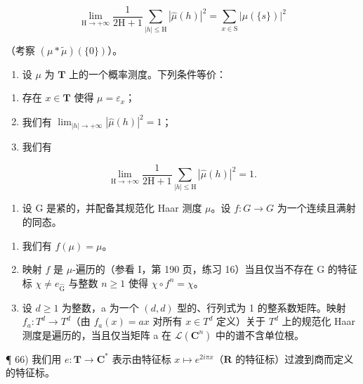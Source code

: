 \[
\lim _ {\mathrm{H} \to + \infty} \frac {1}{2 \mathrm{H} + 1} \sum_ {| h | \leqslant \mathrm{H}} | \widehat {\mu} (h) | ^ {2} = \sum_ {x \in \mathrm{S}} | \mu (\{s \}) | ^ {2}
\]

（考察 \((\mu * \widetilde{\mu})(\{0\})\)）。

\begin{enumerate}
\def\labelenumi{\alph{enumi})}
\setcounter{enumi}{2}
\tightlist
\item
  设 \(\mu\) 为 \(\mathbf{T}\) 上的一个概率测度。下列条件等价：
\end{enumerate}

\begin{enumerate}
\def\labelenumi{(\roman{enumi})}
\item
  存在 \(x \in \mathbf{T}\) 使得 \(\mu = \varepsilon_x\)；
\item
  我们有 \(\lim_{|h|\to+\infty}|\widehat{\mu}(h)|^{2}=1\)；
\item
  我们有
\end{enumerate}

\[
\lim _ {\mathrm{H} \rightarrow + \infty} \frac {1}{2 \mathrm{H} + 1} \sum_ {| h | \leqslant \mathrm{H}} | \widehat {\mu} (h) | ^ {2} = 1.
\]

\begin{enumerate}
\def\labelenumi{\arabic{enumi})}
\setcounter{enumi}{64}
\tightlist
\item
  设 G 是紧的，并配备其规范化 Haar 测度 \(\mu\)。设 \(f: G \to G\) 为一个连续且满射的同态。
\end{enumerate}

\begin{enumerate}
\def\labelenumi{\alph{enumi})}
\item
  我们有 \(f(\mu) = \mu\)。
\item
  映射 \(f\) 是 \(\mu\)-遍历的（参看 I，第 190 页，练习 16）当且仅当不存在 G 的特征标 \(\chi \neq e_{\widehat{\mathrm{G}}}\) 与整数 \(n \geqslant 1\) 使得 \(\chi \circ f^n = \chi\)。
\item
  设 \(d \geqslant 1\) 为整数，a 为一个 \((d, d)\) 型的、行列式为 1 的整系数矩阵。映射 \(f_{a} \colon T^{d} \to T^{d}\)（由 \(f_{a}(x) = ax\) 对所有 \(x \in T^{d}\) 定义）关于 \(T^{d}\) 上的规范化 Haar 测度是遍历的，当且仅当矩阵 a 在 \(\mathcal{L}(\mathbf{C}^{n})\) 中的谱不含单位根。
\end{enumerate}

¶ 66) 我们用 \(e\colon \mathbf{T}\to \mathbf{C}^{*}\) 表示由特征标 \(x\mapsto e^{2i\pi x}\)（\(\mathbf{R}\) 的特征标）过渡到商而定义的特征标。


